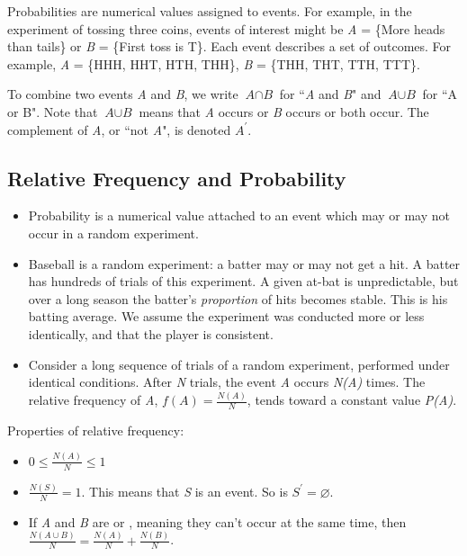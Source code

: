 Probabilities are numerical values assigned to events. For example, in the experiment of tossing three coins, events of interest might be \textit{A} = \{More heads than tails\} or \textit{B} = \{First toss is T\}. Each event describes a set of outcomes. For example, \textit{A} = \{HHH, HHT, HTH, THH\}, \textit{B} = \{THH, THT, TTH, TTT\}.

To combine two events \textit{A} and \textit{B}, we write $\textit{A} \cap \textit{B}$ for ``\textit{A} and \textit{B}" and $\textit{A} \cup \textit{B}$ for ``A or B". Note that $\textit{A} \cup \textit{B}$ means that \textit{A} occurs or \textit{B} occurs or both occur. The complement of \textit{A}, or ``not \textit{A}", is denoted $A^{\mathsf{'}}$.

\subsection{Relative Frequency and Probability}
\begin{itemize}
    \item Probability is a numerical value attached to an event which may or may not occur in a random experiment.
    \item Baseball is a random experiment: a batter may or may not get a hit. A batter has hundreds of trials of this experiment. A given at-bat is unpredictable, but over a long season the batter's \textit{proportion} of hits becomes stable. This is his batting average. We assume the experiment was conducted more or less identically, and that the player is consistent.
    \item Consider a long sequence of trials of a random experiment, performed under identical conditions. After \textit{N} trials, the event \textit{A} occurs \textit{N(A)} times. The relative frequency of \textit{A}, $f(A) = \frac{N(A)}{N}$, tends toward a constant value \textit{P(A)}.
\end{itemize}

Properties of relative frequency:
\begin{itemize}
    \item $0\le\frac{N(A)}{N}\le1$
    \item $\frac{N(S)}{N}=1$. This means that \textit{S} is an event. So is $S^{\mathsf{'}}=\varnothing$.
    \item If \textit{A} and \textit{B} are  or , meaning they can't occur at the same time, then $\frac{N(A\cup B)}{N}=\frac{N(A)}{N}+\frac{N(B)}{N}$.
\end{itemize}

